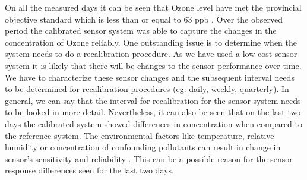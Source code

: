 On all the measured days it can be seen that Ozone level have met the provincial objective standard which is less than or equal to 63 ppb \cite{Environment2016}. Over the observed period the calibrated sensor system was able to capture the changes in the concentration of Ozone  reliably. One outstanding issue is to determine when the system needs to do a recalibration procedure. As we have used a low-cost sensor system it is likely that there will be changes to the sensor performance over time. We have to characterize these sensor changes and the subsequent interval needs to be determined for recalibration procedures (eg: daily, weekly, quarterly). In general, we can say that the interval for recalibration for the sensor system needs to be looked in more detail. Nevertheless, it can also be seen that on the last two days the calibrated system showed differences in concentration when compared to the reference system. The environmental factors like temperature, relative humidity or concentration of confounding pollutants can result in change in sensor's sensitivity and reliability \cite{clements2017low}. This can be a possible reason for the sensor response differences seen for the last two days. 





